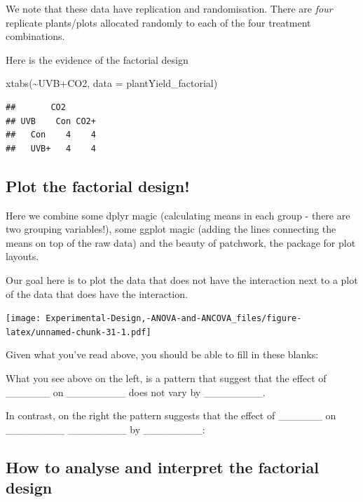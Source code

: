 \documentclass[
]{book}
\newenvironment{Shaded}{\begin{snugshade}}{\end{snugshade}}
\newcommand{\AttributeTok}[1]{\textcolor[rgb]{0.77,0.63,0.00}{#1}}
\newcommand{\FunctionTok}[1]{\textcolor[rgb]{0.00,0.00,0.00}{#1}}
\newcommand{\NormalTok}[1]{#1}
\newcommand{\SpecialCharTok}[1]{\textcolor[rgb]{0.00,0.00,0.00}{#1}}
\begin{document}
We note that these data have replication and randomisation. There are \emph{four} replicate plants/plots allocated randomly to each of the four treatment combinations.

Here is the evidence of the factorial design

\begin{Shaded}
\begin{Highlighting}[]
\FunctionTok{xtabs}\NormalTok{(}\SpecialCharTok{\textasciitilde{}}\NormalTok{UVB}\SpecialCharTok{+}\NormalTok{CO2, }\AttributeTok{data =}\NormalTok{ plantYield\_factorial)}
\end{Highlighting}
\end{Shaded}

\begin{verbatim}
##       CO2
## UVB    Con CO2+
##   Con    4    4
##   UVB+   4    4
\end{verbatim}

\hypertarget{plot-the-factorial-design}{%
\subsection{Plot the factorial design!}\label{plot-the-factorial-design}}

Here we combine some dplyr magic (calculating means in each group - there are two grouping variables!), some ggplot magic (adding the lines connecting the means on top of the raw data) and the beauty of patchwork, the package for plot layouts.

Our goal here is to plot the data that does not have the interaction next to a plot of the data that does have the interaction.

\texttt{[image: Experimental-Design,-ANOVA-and-ANCOVA\_files/figure-latex/unnamed-chunk-31-1.pdf]}

Given what you've read above, you should be able to fill in these blanks:

What you see above on the left, is a pattern that suggest that the effect of \_\_\_\_\_\_ on \_\_\_\_\_\_\_\_ does not vary by \_\_\_\_\_\_\_\_.

In contrast, on the right the pattern suggests that the effect of \_\_\_\_\_\_ on \_\_\_\_\_\_\_\_ \_\_\_\_\_\_\_\_ by \_\_\_\_\_\_\_\_:

\hypertarget{how-to-analyse-and-interpret-the-factorial-design}{%
\subsection{How to analyse and interpret the factorial design}\label{how-to-analyse-and-interpret-the-factorial-design}}
\end{document}
